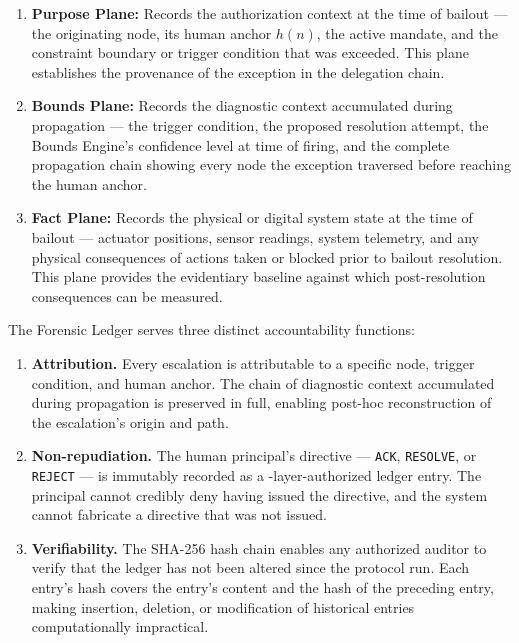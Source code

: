 \begin{enumerate}\itemsep=0pt
\item \textbf{Purpose Plane:} Records the authorization context at the time of bailout — the originating node, its human anchor $h(n)$, the active mandate, and the constraint boundary or trigger condition that was exceeded. This plane establishes the provenance of the exception in the delegation chain.

\item \textbf{Bounds Plane:} Records the diagnostic context accumulated during propagation — the trigger condition, the proposed resolution attempt, the Bounds Engine's confidence level at time of firing, and the complete propagation chain showing every node the exception traversed before reaching the human anchor.

\item \textbf{Fact Plane:} Records the physical or digital system state at the time of bailout — actuator positions, sensor readings, system telemetry, and any physical consequences of actions taken or blocked prior to bailout resolution. This plane provides the evidentiary baseline against which post-resolution consequences can be measured.
\end{enumerate}

The Forensic Ledger serves three distinct accountability functions:

\begin{enumerate}\itemsep=0pt
\item \textbf{Attribution.} Every escalation is attributable to a specific node, trigger condition, and human anchor. The chain of diagnostic context accumulated during propagation is preserved in full, enabling post-hoc reconstruction of the escalation's origin and path.

\item \textbf{Non-repudiation.} The human principal's directive — \texttt{ACK}, \texttt{RESOLVE}, or \texttt{REJECT} — is immutably recorded as a \purpose{}-layer-authorized ledger entry. The principal cannot credibly deny having issued the directive, and the system cannot fabricate a directive that was not issued.

\item \textbf{Verifiability.} The SHA-256 hash chain enables any authorized auditor to verify that the ledger has not been altered since the protocol run. Each entry's hash covers the entry's content and the hash of the preceding entry, making insertion, deletion, or modification of historical entries computationally impractical.
\end{enumerate}

